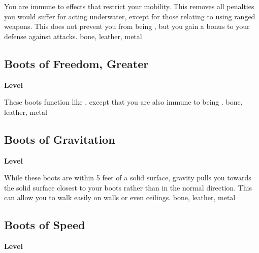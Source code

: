 \vspace{-1.5em}  %
You are immune to effects that restrict your mobility.
This removes all penalties you would suffer for acting underwater, except for those relating to using ranged weapons.
This does not prevent you from being \grappled, but you gain a  bonus to your defense against  attacks.
 
 bone, leather, metal
\begin{multicols}{2}
\lowercase{\hypertarget{item:Boots of Freedom, Greater}{}}\label{item:Boots of Freedom, Greater}
\hypertarget{item:Boots of Freedom, Greater}{\subsection{Boots of Freedom, Greater}}
\columnbreak%
\begin{flushright}
\large\textbf{ Level}
\end{flushright}
\end{multicols}
\vspace{-1.5em}  %
These boots function like , except that you are also immune to being \grappled.
 
 bone, leather, metal
\begin{multicols}{2}
\lowercase{\hypertarget{item:Boots of Gravitation}{}}\label{item:Boots of Gravitation}
\hypertarget{item:Boots of Gravitation}{\subsection{Boots of Gravitation}}
\columnbreak%
\begin{flushright}
\large\textbf{ Level}
\end{flushright}
\end{multicols}
\vspace{-1.5em}  %
While these boots are within 5 feet of a solid surface, gravity pulls you towards the solid surface closest to your boots rather than in the normal direction.
This can allow you to walk easily on walls or even ceilings.
 
 bone, leather, metal
\begin{multicols}{2}
\lowercase{\hypertarget{item:Boots of Speed}{}}\label{item:Boots of Speed}
\hypertarget{item:Boots of Speed}{\subsection{Boots of Speed}}
\columnbreak%
\begin{flushright}
\large\textbf{ Level}
\end{flushright}
\end{multicols}
